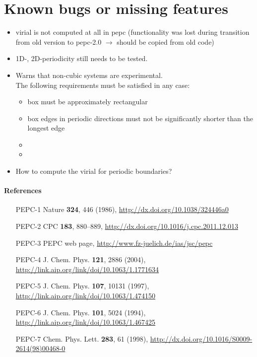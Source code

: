 \section*{Known bugs or missing features}
\begin{itemize}
  \item virial is not computed at all in pepc (functionality was lost during transition from old version to pepc-2.0 $\longrightarrow$ should be copied from old code)
  \item 1D-, 2D-periodicity still needs to be tested.
  \item Warns that non-cubic systems are experimental.\\
      The following requirements must be satisfied in any case:
      \begin{itemize}
        \item box must be approximately rectangular
        \item box edges in periodic directions must not be significantly shorter than the longest edge
        \item {}
        \item {}
      \end{itemize}
  \item How to compute the virial for periodic boundaries?
\end{itemize}

\paragraph{References}
\begin{footnotesize}
\begin{itemize}
  \item[PEPC-1] Nature \textbf{324}, 446 (1986), \url{http://dx.doi.org/10.1038/324446a0}
  \item[PEPC-2] CPC \textbf{183}, 880--889, \url{http://dx.doi.org/10.1016/j.cpc.2011.12.013}
  \item[PEPC-3] PEPC web page, \url{http://www.fz-juelich.de/ias/jsc/pepc}
  \item[PEPC-4] J. Chem. Phys. \textbf{121}, 2886 (2004), \url{http://link.aip.org/link/doi/10.1063/1.1771634}
  \item[PEPC-5] J. Chem. Phys. \textbf{107}, 10131 (1997), \url{http://link.aip.org/link/doi/10.1063/1.474150}
  \item[PEPC-6] J. Chem. Phys. \textbf{101}, 5024 (1994), \url{http://link.aip.org/link/doi/10.1063/1.467425}
  \item[PEPC-7] Chem. Phys. Lett. \textbf{283}, 61 (1998), \url{http://dx.doi.org/10.1016/S0009-2614(98)00468-0}
\end{itemize}
\end{footnotesize}



